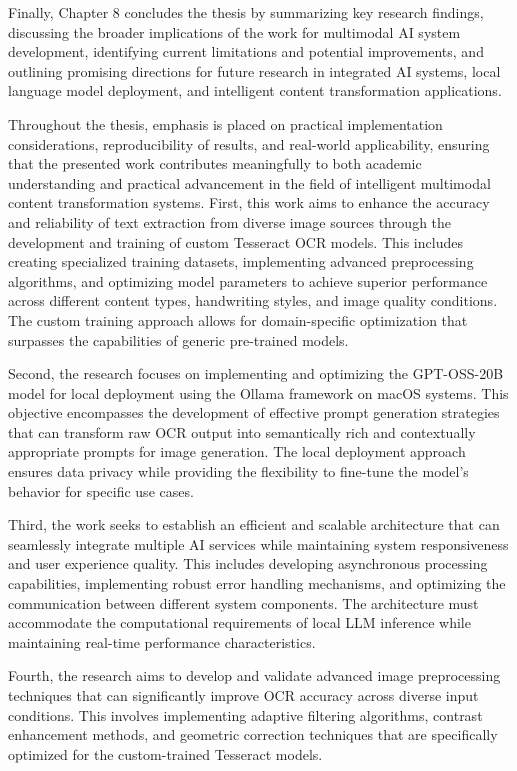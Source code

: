 Finally, Chapter 8 concludes the thesis by summarizing key research findings, discussing the broader implications of the work for multimodal AI system development, identifying current limitations and potential improvements, and outlining promising directions for future research in integrated AI systems, local language model deployment, and intelligent content transformation applications.

Throughout the thesis, emphasis is placed on practical implementation considerations, reproducibility of results, and real-world applicability, ensuring that the presented work contributes meaningfully to both academic understanding and practical advancement in the field of intelligent multimodal content transformation systems.
First, this work aims to enhance the accuracy and reliability of text extraction from diverse image sources through the development and training of custom Tesseract OCR models. This includes creating specialized training datasets, implementing advanced preprocessing algorithms, and optimizing model parameters to achieve superior performance across different content types, handwriting styles, and image quality conditions. The custom training approach allows for domain-specific optimization that surpasses the capabilities of generic pre-trained models.

Second, the research focuses on implementing and optimizing the GPT-OSS-20B model for local deployment using the Ollama framework on macOS systems. This objective encompasses the development of effective prompt generation strategies that can transform raw OCR output into semantically rich and contextually appropriate prompts for image generation. The local deployment approach ensures data privacy while providing the flexibility to fine-tune the model's behavior for specific use cases.

Third, the work seeks to establish an efficient and scalable architecture that can seamlessly integrate multiple AI services while maintaining system responsiveness and user experience quality. This includes developing asynchronous processing capabilities, implementing robust error handling mechanisms, and optimizing the communication between different system components. The architecture must accommodate the computational requirements of local LLM inference while maintaining real-time performance characteristics.

Fourth, the research aims to develop and validate advanced image preprocessing techniques that can significantly improve OCR accuracy across diverse input conditions. This involves implementing adaptive filtering algorithms, contrast enhancement methods, and geometric correction techniques that are specifically optimized for the custom-trained Tesseract models.

